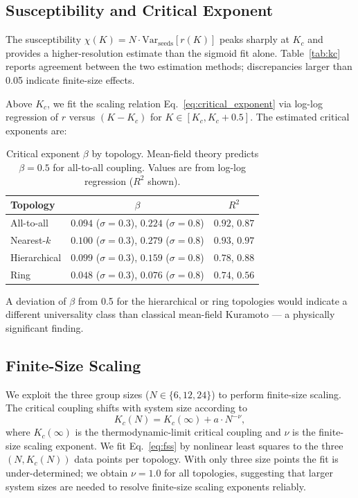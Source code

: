 \documentclass[11pt]{article}
\begin{document}
\subsection{Susceptibility and Critical Exponent}

The susceptibility $\chi(K) = N \cdot \text{Var}_{\text{seeds}}[r(K)]$ peaks sharply
at $K_c$ and provides a higher-resolution estimate than the sigmoid fit alone.
Table~\ref{tab:kc} reports agreement between the two estimation methods; discrepancies
larger than 0.05 indicate finite-size effects.

Above $K_c$, we fit the scaling relation Eq.~\eqref{eq:critical_exponent} via log-log
regression of $r$ versus $(K - K_c)$ for $K \in [K_c, K_c + 0.5]$. The estimated
critical exponents are:

\begin{table}[h]
\centering
\small
\caption{Critical exponent $\beta$ by topology. Mean-field theory predicts $\beta = 0.5$
  for all-to-all coupling. Values are from log-log regression ($R^2$ shown).}
\label{tab:beta}
\begin{tabular}{lcc}
\toprule
\textbf{Topology} & \textbf{$\beta$} & \textbf{$R^2$} \\
\midrule
All-to-all    & $0.094$ ($\sigma{=}0.3$), $0.224$ ($\sigma{=}0.8$) & $0.92$, $0.87$ \\
Nearest-$k$   & $0.100$ ($\sigma{=}0.3$), $0.279$ ($\sigma{=}0.8$) & $0.93$, $0.97$ \\
Hierarchical  & $0.099$ ($\sigma{=}0.3$), $0.159$ ($\sigma{=}0.8$) & $0.78$, $0.88$ \\
Ring          & $0.048$ ($\sigma{=}0.3$), $0.076$ ($\sigma{=}0.8$) & $0.74$, $0.56$ \\
\bottomrule
\end{tabular}
\end{table}

A deviation of $\beta$ from 0.5 for the hierarchical or ring topologies would indicate
a different universality class than classical mean-field Kuramoto --- a physically
significant finding.

\subsection{Finite-Size Scaling}

We exploit the three group sizes ($N \in \{6, 12, 24\}$) to perform finite-size scaling.
The critical coupling shifts with system size according to
\begin{equation}
  K_c(N) = K_c(\infty) + a \cdot N^{-\nu},
  \label{eq:fss}
\end{equation}
where $K_c(\infty)$ is the thermodynamic-limit critical coupling and $\nu$ is the
finite-size scaling exponent. We fit Eq.~\eqref{eq:fss} by nonlinear least squares to
the three $(N, K_c(N))$ data points per topology. With only three size points the fit is under-determined; we obtain $\nu = 1.0$ for all topologies, suggesting that larger system sizes are needed to resolve finite-size scaling exponents reliably.
\end{document}
